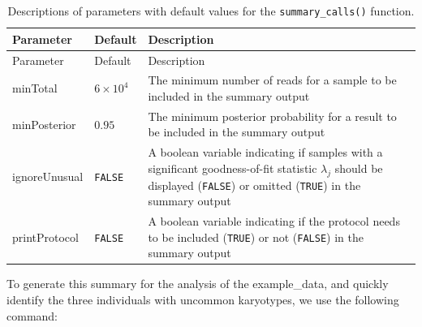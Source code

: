 \documentclass[
  letterpaper,
  DIV=11,
  numbers=noendperiod]{scrartcl}
\begin{document}
\begin{longtable}[]{@{}
  >{\raggedright\arraybackslash}p{}
  >{\raggedright\arraybackslash}p{}
  >{\raggedright\arraybackslash}p{}@{}}
\caption{Descriptions of parameters with default values for the
\protect\texttt{summary\_calls()}
function\label{tab:summary_calls}.}\tabularnewline
\toprule\noalign{}
\begin{minipage}[b]{\linewidth}\raggedright
Parameter
\end{minipage} & \begin{minipage}[b]{\linewidth}\raggedright
Default
\end{minipage} & \begin{minipage}[b]{\linewidth}\raggedright
Description
\end{minipage} \\
\midrule\noalign{}
\endfirsthead
\toprule\noalign{}
\begin{minipage}[b]{\linewidth}\raggedright
Parameter
\end{minipage} & \begin{minipage}[b]{\linewidth}\raggedright
Default
\end{minipage} & \begin{minipage}[b]{\linewidth}\raggedright
Description
\end{minipage} \\
\midrule\noalign{}
\endhead
\bottomrule\noalign{}
\endlastfoot
minTotal & \(6\times 10^{4}\) & The minimum number of reads for a sample
to be included in the summary output \\
minPosterior & \(0.95\) & The minimum posterior probability for a result
to be included in the summary output \\
ignoreUnusual & \texttt{FALSE} & A boolean variable indicating if
samples with a significant goodness-of-fit statistic \(\lambda_j\)
should be displayed (\texttt{FALSE}) or omitted (\texttt{TRUE}) in the
summary output \\
printProtocol & \texttt{FALSE} & A boolean variable indicating if the
protocol needs to be included (\texttt{TRUE}) or not (\texttt{FALSE}) in
the summary output \\
\end{longtable}

To generate this summary for the analysis of the example\_data, and
quickly identify the three individuals with uncommon karyotypes, we use
the following command:
\end{document}
